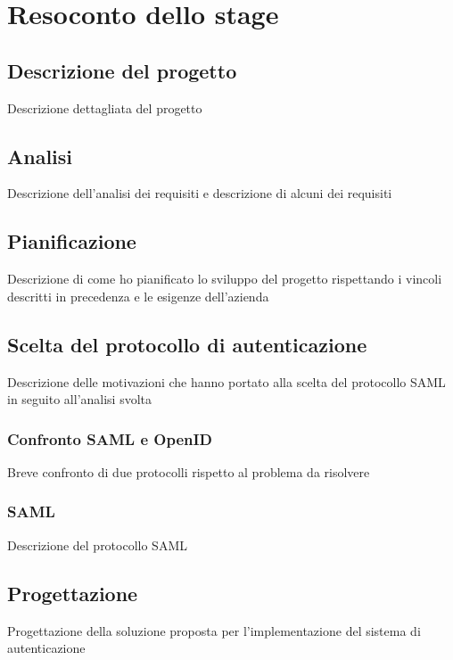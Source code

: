 
\chapter{Resoconto dello stage}
\label{cap:resoconto}

\section{Descrizione del progetto}
Descrizione dettagliata del progetto

\section{Analisi}
Descrizione dell'analisi dei requisiti e descrizione di alcuni dei requisiti

\section{Pianificazione}
Descrizione di come ho pianificato lo sviluppo del progetto rispettando i vincoli descritti in precedenza e le esigenze dell'azienda

\section{Scelta del protocollo di autenticazione}
Descrizione delle motivazioni che hanno portato alla scelta del protocollo SAML in seguito all'analisi svolta
\subsection{Confronto SAML e OpenID}
Breve confronto di due protocolli rispetto al problema da risolvere
\subsection{SAML}
Descrizione del protocollo SAML

\section{Progettazione}
Progettazione della soluzione proposta per l'implementazione del sistema di autenticazione
